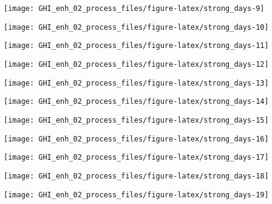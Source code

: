 \documentclass[
  10pt,
  a4paper,oneside]{article}
\begin{document}
\begin{center}\texttt{[image: GHI\_enh\_02\_process\_files/figure-latex/strong\_days-9]} \end{center}

\begin{center}\texttt{[image: GHI\_enh\_02\_process\_files/figure-latex/strong\_days-10]} \end{center}

\begin{center}\texttt{[image: GHI\_enh\_02\_process\_files/figure-latex/strong\_days-11]} \end{center}

\begin{center}\texttt{[image: GHI\_enh\_02\_process\_files/figure-latex/strong\_days-12]} \end{center}

\begin{center}\texttt{[image: GHI\_enh\_02\_process\_files/figure-latex/strong\_days-13]} \end{center}

\begin{center}\texttt{[image: GHI\_enh\_02\_process\_files/figure-latex/strong\_days-14]} \end{center}

\begin{center}\texttt{[image: GHI\_enh\_02\_process\_files/figure-latex/strong\_days-15]} \end{center}

\begin{center}\texttt{[image: GHI\_enh\_02\_process\_files/figure-latex/strong\_days-16]} \end{center}

\begin{center}\texttt{[image: GHI\_enh\_02\_process\_files/figure-latex/strong\_days-17]} \end{center}

\begin{center}\texttt{[image: GHI\_enh\_02\_process\_files/figure-latex/strong\_days-18]} \end{center}

\begin{center}\texttt{[image: GHI\_enh\_02\_process\_files/figure-latex/strong\_days-19]} \end{center}
\end{document}

